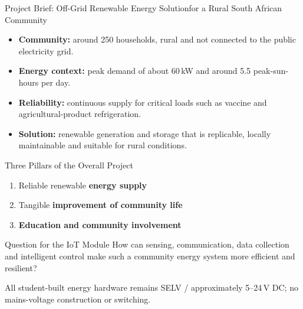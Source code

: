 \begin{frame}{Project Brief: Off-Grid Renewable Energy Solution}{for a Rural South African Community}
\begin{itemize}
    \item \textbf{Community:} around 250 households, rural and not connected to the public electricity grid.
    \item \textbf{Energy context:} peak demand of about 60\,kW and around 5.5 peak-sun-hours per day.
    \item \textbf{Reliability:} continuous supply for critical loads such as vaccine and agricultural-product refrigeration.
    \item \textbf{Solution:} renewable generation and storage that is replicable, locally maintainable and suitable for rural conditions.
\end{itemize}

\begin{block}{Three Pillars of the Overall Project}
\begin{enumerate}
    \item Reliable renewable \textbf{energy supply}
    \item Tangible \textbf{improvement of community life}
    \item \textbf{Education and community involvement}
\end{enumerate}
\end{block}

\begin{alertblock}{Question for the IoT Module}
How can sensing, communication, data collection and intelligent control make such a community energy system more efficient and resilient?
\end{alertblock}

\centering\footnotesize All student-built energy hardware remains SELV / approximately 5--24\,V DC; no mains-voltage construction or switching.
\end{frame}
